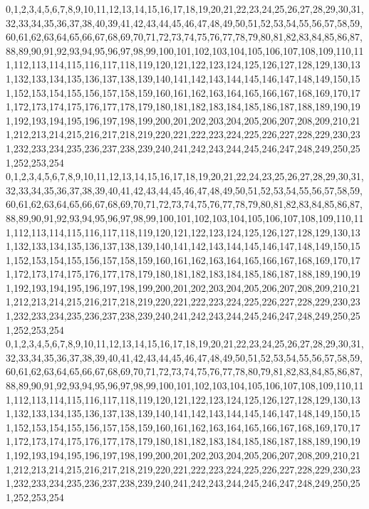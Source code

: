 \documentclass[12pt]{article}
\begin{document}
{0,1,2,3,4,5,6,7,8,9,10,11,12,13,14,15,16,17,18,19,20,21,22,23,24,25,26,27,28,29,30,31,32,33,34,35,36,37,38,40,39,41,42,43,44,45,46,47,48,49,50,51,52,53,54,55,56,57,58,59,60,61,62,63,64,65,66,67,68,69,70,71,72,73,74,75,76,77,78,79,80,81,82,83,84,85,86,87,88,89,90,91,92,93,94,95,96,97,98,99,100,101,102,103,104,105,106,107,108,109,110,111,112,113,114,115,116,117,118,119,120,121,122,123,124,125,126,127,128,129,130,131,132,133,134,135,136,137,138,139,140,141,142,143,144,145,146,147,148,149,150,151,152,153,154,155,156,157,158,159,160,161,162,163,164,165,166,167,168,169,170,171,172,173,174,175,176,177,178,179,180,181,182,183,184,185,186,187,188,189,190,191,192,193,194,195,196,197,198,199,200,201,202,203,204,205,206,207,208,209,210,211,212,213,214,215,216,217,218,219,220,221,222,223,224,225,226,227,228,229,230,231,232,233,234,235,236,237,238,239,240,241,242,243,244,245,246,247,248,249,250,251,252,253,254\\
0,1,2,3,4,5,6,7,8,9,10,11,12,13,14,15,16,17,18,19,20,21,22,24,23,25,26,27,28,29,30,31,32,33,34,35,36,37,38,39,40,41,42,43,44,45,46,47,48,49,50,51,52,53,54,55,56,57,58,59,60,61,62,63,64,65,66,67,68,69,70,71,72,73,74,75,76,77,78,79,80,81,82,83,84,85,86,87,88,89,90,91,92,93,94,95,96,97,98,99,100,101,102,103,104,105,106,107,108,109,110,111,112,113,114,115,116,117,118,119,120,121,122,123,124,125,126,127,128,129,130,131,132,133,134,135,136,137,138,139,140,141,142,143,144,145,146,147,148,149,150,151,152,153,154,155,156,157,158,159,160,161,162,163,164,165,166,167,168,169,170,171,172,173,174,175,176,177,178,179,180,181,182,183,184,185,186,187,188,189,190,191,192,193,194,195,196,197,198,199,200,201,202,203,204,205,206,207,208,209,210,211,212,213,214,215,216,217,218,219,220,221,222,223,224,225,226,227,228,229,230,231,232,233,234,235,236,237,238,239,240,241,242,243,244,245,246,247,248,249,250,251,252,253,254\\
0,1,2,3,4,5,6,7,8,9,10,11,12,13,14,15,16,17,18,19,20,21,22,23,24,25,26,27,28,29,30,31,32,33,34,35,36,37,38,39,40,41,42,43,44,45,46,47,48,49,50,51,52,53,54,55,56,57,58,59,60,61,62,63,64,65,66,67,68,69,70,71,72,73,74,75,76,77,78,80,79,81,82,83,84,85,86,87,88,89,90,91,92,93,94,95,96,97,98,99,100,101,102,103,104,105,106,107,108,109,110,111,112,113,114,115,116,117,118,119,120,121,122,123,124,125,126,127,128,129,130,131,132,133,134,135,136,137,138,139,140,141,142,143,144,145,146,147,148,149,150,151,152,153,154,155,156,157,158,159,160,161,162,163,164,165,166,167,168,169,170,171,172,173,174,175,176,177,178,179,180,181,182,183,184,185,186,187,188,189,190,191,192,193,194,195,196,197,198,199,200,201,202,203,204,205,206,207,208,209,210,211,212,213,214,215,216,217,218,219,220,221,222,223,224,225,226,227,228,229,230,231,232,233,234,235,236,237,238,239,240,241,242,243,244,245,246,247,248,249,250,251,252,253,254\\
}
\end{document}

